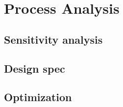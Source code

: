 \chapter{Process Analysis}

\section{Sensitivity analysis}

\section{Design spec}

\section{Optimization}